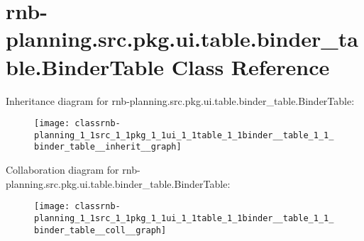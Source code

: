 \hypertarget{classrnb-planning_1_1src_1_1pkg_1_1ui_1_1table_1_1binder__table_1_1_binder_table}{}\section{rnb-\/planning.src.\+pkg.\+ui.\+table.\+binder\+\_\+table.\+Binder\+Table Class Reference}
\label{classrnb-planning_1_1src_1_1pkg_1_1ui_1_1table_1_1binder__table_1_1_binder_table}


Inheritance diagram for rnb-\/planning.src.\+pkg.\+ui.\+table.\+binder\+\_\+table.\+Binder\+Table\+:
\nopagebreak
\begin{figure}[H]
\begin{center}
\leavevmode
\texttt{[image: classrnb-planning\_1\_1src\_1\_1pkg\_1\_1ui\_1\_1table\_1\_1binder\_\_table\_1\_1\_binder\_table\_\_inherit\_\_graph]}
\end{center}
\end{figure}


Collaboration diagram for rnb-\/planning.src.\+pkg.\+ui.\+table.\+binder\+\_\+table.\+Binder\+Table\+:
\nopagebreak
\begin{figure}[H]
\begin{center}
\leavevmode
\texttt{[image: classrnb-planning\_1\_1src\_1\_1pkg\_1\_1ui\_1\_1table\_1\_1binder\_\_table\_1\_1\_binder\_table\_\_coll\_\_graph]}
\end{center}
\end{figure}
